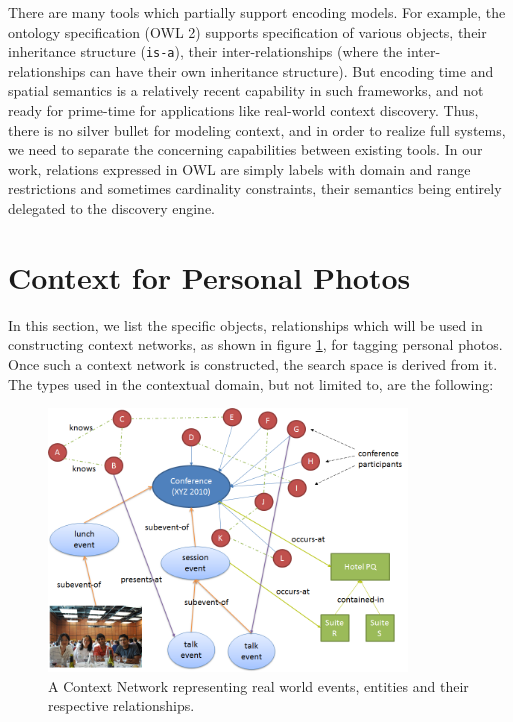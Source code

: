 There are many tools which partially support encoding models. For example, the ontology specification (OWL 2) supports specification of various objects, their inheritance structure (\texttt{is-a}), their inter-relationships (where the inter-relationships can have their own inheritance structure). But encoding time and spatial semantics is a relatively recent capability \cite{hobbs2006time} in such frameworks, and not ready for prime-time for applications like real-world context discovery. Thus, there is no silver bullet for modeling context, and in order to realize full systems, we need to separate the concerning capabilities between existing tools. In our work, relations expressed in OWL are simply labels with domain and range restrictions and sometimes cardinality constraints, their semantics being entirely delegated to the discovery engine.

\section{Context for Personal Photos}
In this section, we list the specific objects, relationships which will be used in constructing context networks, as shown in figure \ref{fig:context-network-large}, for tagging personal photos. Once such a context network is constructed, the search space is derived from it. The types used in the contextual domain, but not limited to, are the following:

\begin{figure}[h]
\centering
\includegraphics[width=0.85\textwidth]{media/chapter2/context-network-large.png}
\caption{A Context Network representing real world events, entities and their respective relationships.}
\label{fig:context-network-large}
\end{figure}

